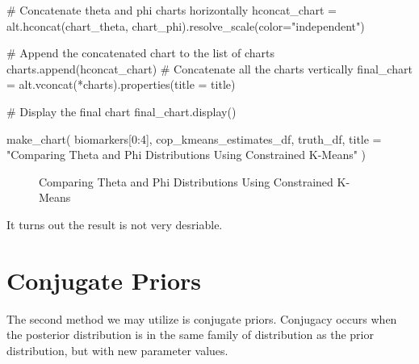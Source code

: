 \documentclass[
  letterpaper,
  DIV=11,
  numbers=noendperiod]{scrreprt}
\newenvironment{Shaded}{\begin{snugshade}}{\end{snugshade}}
\newcommand{\CommentTok}[1]{\textcolor[rgb]{0.37,0.37,0.37}{#1}}
\newcommand{\DecValTok}[1]{\textcolor[rgb]{0.68,0.00,0.00}{#1}}
\newcommand{\NormalTok}[1]{\textcolor[rgb]{0.00,0.23,0.31}{#1}}
\newcommand{\OperatorTok}[1]{\textcolor[rgb]{0.37,0.37,0.37}{#1}}
\newcommand{\StringTok}[1]{\textcolor[rgb]{0.13,0.47,0.30}{#1}}
\begin{document}
\begin{Shaded}
\begin{Highlighting}[]
        \CommentTok{\# Concatenate theta and phi charts horizontally}
\NormalTok{        hconcat\_chart }\OperatorTok{=}\NormalTok{ alt.hconcat(chart\_theta, chart\_phi).resolve\_scale(color}\OperatorTok{=}\StringTok{"independent"}\NormalTok{)}

        \CommentTok{\# Append the concatenated chart to the list of charts}
\NormalTok{        charts.append(hconcat\_chart)}
    \CommentTok{\# Concatenate all the charts vertically}
\NormalTok{    final\_chart }\OperatorTok{=}\NormalTok{ alt.vconcat(}\OperatorTok{*}\NormalTok{charts).properties(title }\OperatorTok{=}\NormalTok{ title)}

    \CommentTok{\# Display the final chart}
\NormalTok{    final\_chart.display()}
\end{Highlighting}
\end{Shaded}

\begin{Shaded}
\begin{Highlighting}[]
\NormalTok{make\_chart(}
\NormalTok{    biomarkers[}\DecValTok{0}\NormalTok{:}\DecValTok{4}\NormalTok{], }
\NormalTok{    cop\_kmeans\_estimates\_df, }
\NormalTok{    truth\_df, }
\NormalTok{    title }\OperatorTok{=} \StringTok{"Comparing Theta and Phi Distributions Using Constrained K{-}Means"}
\NormalTok{)}
\end{Highlighting}
\end{Shaded}

\begin{figure}[H]


\caption{\label{fig-estdistparamscopkm}Comparing Theta and Phi
Distributions Using Constrained K-Means}

\end{figure}%

It turns out the result is not very desriable.

\section{Conjugate Priors}\label{sec-conjugate-priors}

The second method we may utilize is conjugate priors. Conjugacy occurs
when the posterior distribution is in the same family of distribution as
the prior distribution, but with new parameter values.
\end{document}
